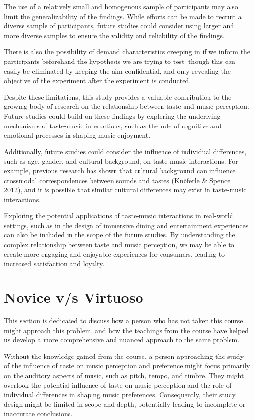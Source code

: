 \documentclass[conference]{IEEEtran}
\begin{document}
The use of a relatively small and homogenous sample of participants may also limit the generalizability of the findings. While efforts can be made to recruit a diverse sample of participants, future studies could consider using larger and more diverse samples to ensure the validity and reliability of the findings.

There is also the possibility of demand characteristics creeping in if we inform the participants beforehand the hypothesis we are trying to test, though this can easily be eliminated by keeping the aim confidential, and only revealing the objective of the experiment after the experiment is conducted.

Despite these limitations, this study provides a valuable contribution to the growing body of research on the relationship between taste and music perception. Future studies could build on these findings by exploring the underlying mechanisms of taste-music interactions, such as the role of cognitive and emotional processes in shaping music enjoyment.

Additionally, future studies could consider the influence of individual differences, such as age, gender, and cultural background, on taste-music interactions. For example, previous research has shown that cultural background can influence crossmodal correspondences between sounds and tastes (Knöferle \& Spence, 2012), and it is possible that similar cultural differences may exist in taste-music interactions.

Exploring the potential applications of taste-music interactions in real-world settings, such as in the design of immersive dining and entertainment experiences can also be included in the scope of the future studies. By understanding the complex relationship between taste and music perception, we may be able to create more engaging and enjoyable experiences for consumers, leading to increased satisfaction and loyalty.

\section{Novice v/s Virtuoso}

This section is dedicated to discuss how a person who has not taken this course might approach this problem, and how the teachings from the course have helped us develop a more comprehensive and nuanced approach to the same problem.

Without the knowledge gained from the course, a person approaching the study of the influence of taste on music perception and preference might focus primarily on the auditory aspects of music, such as pitch, tempo, and timbre. They might overlook the potential influence of taste on music perception and the role of individual differences in shaping music preferences. Consequently, their study design might be limited in scope and depth, potentially leading to incomplete or inaccurate conclusions.
\end{document}
